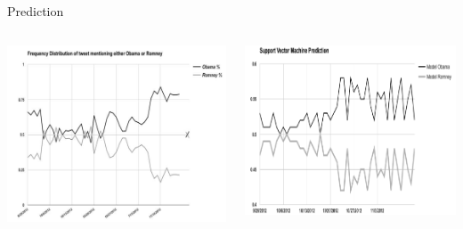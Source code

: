 \documentclass[usenames,dvipsnames,aspectratio=169]{beamer}
\begin{document}
	\begin{frame}{Prediction}
	\begin{columns}
	
	\begin{column}{0.45\textwidth}
		\begin{tcolorbox}[colback=white, colframe=ElixirPurple, arc=3mm, boxrule=0mm, height=0.8\textheight, valign=center, title=Frequency]
				\includegraphics[width=\tcbtextwidth,   keepaspectratio]{pictures/TwitterElection2012/twitter_temp_distr.png}
		\end{tcolorbox}
	\end{column}
	
	\begin{column}{0.45\textwidth}
		\begin{tcolorbox}[colback=white, colframe=ElixirPurple, arc=3mm, boxrule=0mm, height=0.8\textheight, valign=center, title=Prediction]
			\includegraphics[width=\tcbtextwidth,   keepaspectratio]{pictures/TwitterElection2012/twitter_svm.png}
		\end{tcolorbox}
	\end{column}
	
	\end{columns}
	\end{frame}
	
\end{document}
